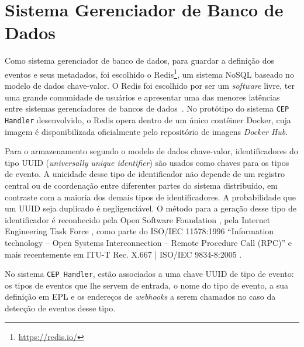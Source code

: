 \section{Sistema Gerenciador de Banco de Dados}
\label{sec:redis}

Como sistema gerenciador de banco de dados, para guardar a definição dos eventos e seus metadados, foi escolhido o Redis\footnote{\url{https://redis.io/}}, um sistema NoSQL baseado no modelo de dados chave-valor.
O Redis foi escolhido por ser um \textit{software} livre, ter uma grande comunidade de usuários e apresentar uma das menores latências entre sistemas gerenciadores de bancos de dados~\citep{10.14778/2367502.2367512}.
No protótipo do sistema \texttt{CEP Handler} desenvolvido, o Redis opera dentro de um único contêiner Docker, cuja imagem é disponibilizada oficialmente pelo repositório de imagens \textit{Docker Hub}.
 

Para o armazenamento segundo o modelo de dados chave-valor,  identificadores do tipo UUID (\textit{universally unique identifier}) são usados como chaves para os tipos de evento. A unicidade desse tipo de identificador não depende de um registro central ou de coordenação entre diferentes partes do sistema distribuído, em contraste com a maioria dos demais tipos de identificadores. A probabilidade que um UUID seja duplicado é negligenciável. O método para a geração desse tipo de identificador é reconhecido pela Open Software Foundation
\citep{osf}, 
pela  Internet Engineering Task Force %
\citep{ietf}, como parte do  ISO/IEC 11578:1996 ``Information technology – Open Systems Interconnection – Remote Procedure Call (RPC)'' e mais recentemente em  ITU-T Rec. X.667 | ISO/IEC 9834-8:2005
\citep{ISOUUID}.%

No sistema \texttt{CEP Handler}, estão associados a  uma chave UUID de tipo de evento: os tipos de eventos que lhe servem de entrada, o nome do tipo de evento, a sua definição em EPL e os endereços de \textit{webhooks} a serem chamados no caso da detecção de eventos desse tipo.



